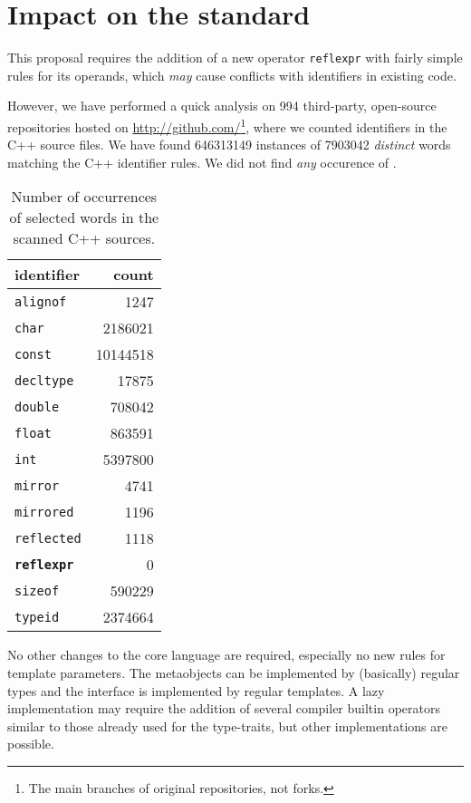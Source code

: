 \section{Impact on the standard}

This proposal requires the addition of a new operator
\texttt{reflexpr} with fairly simple rules for its operands,
which {\em may} cause conflicts with identifiers in existing code.

However, we have performed a quick analysis on \num{994} third-party, open-source
repositories hosted on \url{http://github.com/}\footnote{The main branches
of original repositories, not forks.}, where we counted identifiers
in the C++ source files. We have found \num{646313149} instances of
\num{7903042} {\em distinct} words matching the C++ identifier rules.
We did not find {\em any} occurence of .

\begin{table}[h]
\centering
\begin{tabular}{|l|r|}
\hline
\textbf{identifier} & \textbf{count} \\\hline
\hline
\texttt{alignof} & \num{1247} \\\hline
\texttt{char} & \num{2186021} \\\hline
\texttt{const} & \num{10144518} \\\hline
\texttt{decltype} & \num{17875} \\\hline
\texttt{double} & \num{708042} \\\hline
\texttt{float} & \num{863591} \\\hline
\texttt{int} & \num{5397800} \\\hline
\texttt{mirror} & \num{4741} \\\hline
\texttt{mirrored} & \num{1196} \\\hline
\texttt{reflected} & \num{1118} \\\hline
\textbf{\texttt{reflexpr}} & \num{0} \\\hline
\texttt{sizeof} & \num{590229} \\\hline
\texttt{typeid} & \num{2374664} \\\hline


\end{tabular}
\label{table-identifier-occurences}
\caption{Number of occurrences of selected words in the scanned C++ sources.}
\end{table}


No other changes to the core language are required, especially no new rules
for template parameters. The metaobjects can be implemented by (basically) regular
types and the interface is implemented by regular templates.
A lazy implementation may require the addition of several compiler builtin
operators similar to those already used for the type-traits, but other
implementations are possible.
